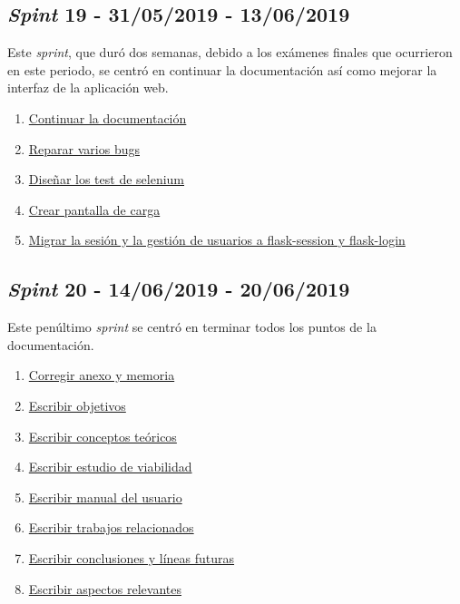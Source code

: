 \subsection{\textit{Spint} 19 - 31/05/2019 - 13/06/2019}
Este \textit{sprint}, que duró dos semanas, debido a los exámenes finales que ocurrieron en este periodo, se centró en continuar la documentación así como mejorar la interfaz de la aplicación web.

\begin{enumerate}\addtocounter{enumi}{92}
	\item 
	\href{https://github.com/jlgarridol/TFG-SmartBeds/issues/93}{Continuar la documentación}
	\item 
	\href{https://github.com/jlgarridol/TFG-SmartBeds/issues/94}{Reparar varios bugs}
	\item 
	\href{https://github.com/jlgarridol/TFG-SmartBeds/issues/95}{Diseñar los test de selenium}
	\item 
	\href{https://github.com/jlgarridol/TFG-SmartBeds/issues/96}{Crear pantalla de carga}
	\item 
	\href{https://github.com/jlgarridol/TFG-SmartBeds/issues/97}{Migrar la sesión y la gestión de usuarios a flask-session y flask-login}
\end{enumerate}

\subsection{\textit{Spint} 20 - 14/06/2019 - 20/06/2019}
Este penúltimo \textit{sprint} se centró en terminar todos los puntos de la documentación.

\begin{enumerate}\addtocounter{enumi}{97}
	\item 
	\href{https://github.com/jlgarridol/TFG-SmartBeds/issues/98}{Corregir anexo y memoria}
	\item 
	\href{https://github.com/jlgarridol/TFG-SmartBeds/issues/99}{Escribir objetivos}
	\item 
	\href{https://github.com/jlgarridol/TFG-SmartBeds/issues/100}{Escribir conceptos teóricos}
	\item 
	\href{https://github.com/jlgarridol/TFG-SmartBeds/issues/101}{Escribir estudio de viabilidad}
	\item 
	\href{https://github.com/jlgarridol/TFG-SmartBeds/issues/102}{Escribir manual del usuario}
	\item 
	\href{https://github.com/jlgarridol/TFG-SmartBeds/issues/103}{Escribir trabajos relacionados}
	\item 
	\href{https://github.com/jlgarridol/TFG-SmartBeds/issues/104}{Escribir conclusiones y líneas futuras}
	\item 
	\href{https://github.com/jlgarridol/TFG-SmartBeds/issues/105}{Escribir aspectos relevantes}
\end{enumerate}

